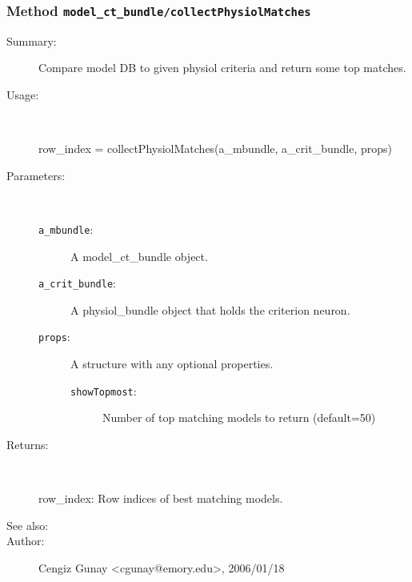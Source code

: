 \subsubsection[Method \texttt{collectPhysiolMatches}]{Method \texttt{model\_ct\_bundle/collectPhysiolMatches}}%
%
\label{ref_model_ct_bundle__collectPhysiolMatches}%
\hypertarget{ref_model_ct_bundle__collectPhysiolMatches}{}%
\begin{description}
\item[Summary:]Compare model DB to given physiol criteria and return some top matches.
%
\item[Usage:]~%
\begin{lyxcode}%
row\_index = collectPhysiolMatches(a\_mbundle, a\_crit\_bundle, props)
%
\end{lyxcode}%
%
%
\item[Parameters:]~
\begin{description}%
\item[\texttt{a\_mbundle}:]
 A model\_ct\_bundle object.
\item[\texttt{a\_crit\_bundle}:]
 A physiol\_bundle object that holds the criterion neuron.
\item[\texttt{props}:]
 A structure with any optional properties.
\begin{description}%
\item[\texttt{showTopmost}:]
 Number of top matching models to return (default=50)
\end{description}%
\end{description}%
%
\item[Returns: 
]~

	row\_index: Row indices of best matching models.
%
%
\item[See also:]%
%
\item[Author:]%
Cengiz Gunay <cgunay@emory.edu>, 2006/01/18
%
\end{description}
\methodline%
